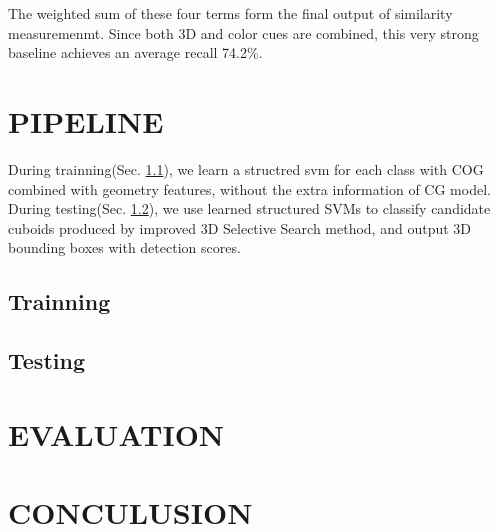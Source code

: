 \documentclass[english]{ccdconf}
\begin{document}
The weighted sum of these four terms form the final output of similarity measuremenmt. Since both 3D and color cues are combined,
this very strong baseline achieves an average recall 74.2\%.
\section{PIPELINE}
During trainning(Sec. \ref{Train}), we learn a structred svm for each class with COG combined with geometry features, without the extra information of CG model. During testing(Sec. \ref{Test}), we use learned structured SVMs to classify candidate cuboids produced by improved 3D Selective Search method, and output 3D bounding boxes with detection scores.
\subsection{Trainning}
\label{Train}
\subsection{Testing}
\label{Test}
\section{EVALUATION}
\section{CONCULUSION}
%
\end{document}

